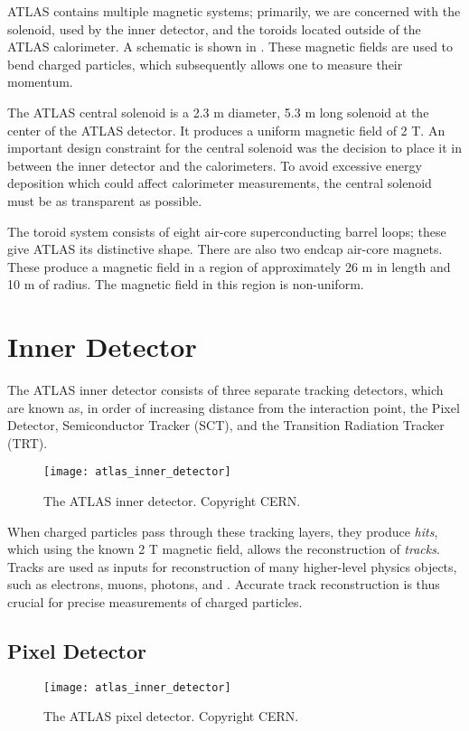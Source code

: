 ATLAS contains multiple magnetic systems; primarily, we are concerned with the solenoid, used by the inner detector, and the toroids located outside of the ATLAS calorimeter.
A schematic is shown in .
These magnetic fields are used to bend charged particles, which subsequently allows one to measure their momentum.

The ATLAS central solenoid is a 2.3 m diameter, 5.3 m long solenoid at the center of the ATLAS detector.
It produces a uniform magnetic field of 2 T.
An important design constraint for the central solenoid was the decision to place it in between the inner detector and the calorimeters.
To avoid excessive energy deposition which could affect calorimeter measurements, the central solenoid must be as transparent as possible\footnotemark.

The toroid system consists of eight air-core superconducting barrel loops; these give ATLAS its distinctive shape.
There are also two endcap air-core magnets.
These produce a magnetic field in a region of approximately 26 m in length and 10 m of radius.
The magnetic field in this region is non-uniform.

\section{Inner Detector}

The ATLAS inner detector consists of three separate tracking detectors, which are known as, in order of increasing distance from the interaction point, the Pixel Detector, Semiconductor Tracker (SCT), and the Transition Radiation Tracker (TRT).
\begin{figure}
\caption{The ATLAS inner detector. Copyright CERN.} \label{fig:atlas_inner_detector}
\texttt{[image: atlas\_inner\_detector]}
\end{figure}
When charged particles pass through these tracking layers, they produce \textit{hits}, which using the known 2 T magnetic field, allows the reconstruction of \textit{tracks}.
Tracks are used as inputs for reconstruction of many higher-level physics objects, such as electrons, muons, photons, and \met.
Accurate track reconstruction is thus crucial for precise measurements of charged particles.

\subsection{Pixel Detector}
\begin{figure}
\caption{The ATLAS pixel detector. Copyright CERN.} \label{fig:atlas_inner_detector}
\texttt{[image: atlas\_inner\_detector]}
\end{figure}

